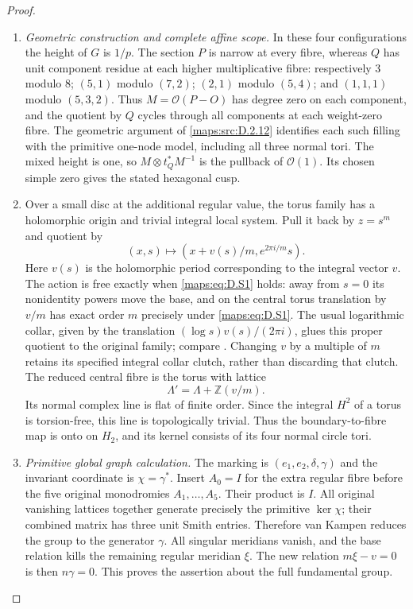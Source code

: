\begin{proof}
\begin{enumerate}[label=\arabic*.,leftmargin=*]
\item \emph{Geometric construction and complete affine scope.}
In these four configurations the height of $G$ is $1/p$.
The section $P$ is narrow at every fibre, whereas $Q$ has
unit component residue at each higher multiplicative fibre:
respectively $3$ modulo $8$; $(5,1)$ modulo $(7,2)$;
$(2,1)$ modulo $(5,4)$; and $(1,1,1)$ modulo $(5,3,2)$.
Thus $M=\mathcal O(P-O)$ has degree zero on each component,
and the quotient by $Q$ cycles through all components at each
weight-zero fibre. The geometric argument of \ref{maps:src:D.2.12} identifies
each such filling with the primitive one-node model, including
all three normal tori. The mixed height is one, so
$M\otimes t_Q^*M^{-1}$ is the pullback of $\mathcal O(1)$.
Its chosen simple zero gives the stated hexagonal cusp.

\item Over a small disc at the additional regular value, the torus
family has a holomorphic origin and trivial integral local
system. Pull it back by $z=s^m$ and quotient by
\[
 (x,s)\longmapsto (x+v(s)/m,e^{2\pi i/m}s).
\]
Here $v(s)$ is the holomorphic period corresponding to the
integral vector $v$. The action is free exactly when \eqref{maps:eq:D.S1}
holds: away from $s=0$ its nonidentity powers move the base,
and on the central torus translation by $v/m$ has exact
order $m$ precisely under \eqref{maps:eq:D.S1}. The usual logarithmic
collar, given by the translation
$(\log s)v(s)/(2\pi i)$, glues this proper quotient to the
original family; compare \cite[Proposition 2.3]{manViaclovskyLogs26}.
Changing $v$ by a multiple of $m$ retains its specified
integral collar clutch, rather than discarding that clutch.
The reduced central fibre is the torus with lattice
\[
 \Lambda'=\Lambda+\mathbb Z(v/m).
 \tag{D.S5}\label{maps:eq:D.S5}
\]
Its normal complex line is flat of finite order. Since the
integral $H^2$ of a torus is torsion-free, this line is
topologically trivial. Thus the boundary-to-fibre map is
onto on $H_2$, and its kernel consists of its four normal
circle tori.

\item \emph{Primitive global graph calculation.}
The marking is $(e_1,e_2,\delta,\gamma)$ and the invariant
coordinate is $\chi=\gamma^*$. Insert $A_0=I$ for the extra
regular fibre before the five original monodromies
$A_1,\ldots,A_5$. Their product is $I$.
All original vanishing lattices together generate precisely
the primitive $\ker\chi$; their combined matrix has three
unit Smith entries. Therefore van Kampen reduces the group
to the generator $\gamma$. All singular meridians vanish,
and the base relation kills the remaining regular meridian
$\xi$. The new relation $m\xi-v=0$ is then $n\gamma=0$.
This proves the assertion about the full fundamental group.


\end{enumerate}
\end{proof}
